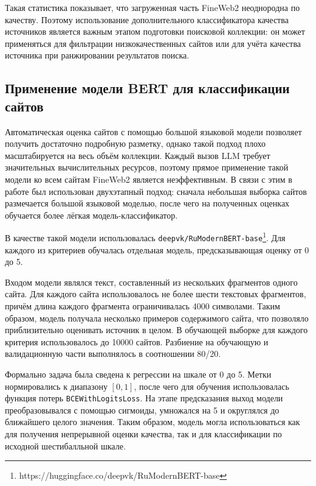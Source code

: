 \documentclass[oneside,senior,etd]{BYUPhys}
\begin{document}
Такая статистика показывает, что загруженная часть FineWeb2 неоднородна по качеству. 
Поэтому использование дополнительного классификатора качества источников является важным этапом подготовки поисковой коллекции: 
он может применяться для фильтрации низкокачественных сайтов или для учёта качества источника при ранжировании результатов поиска.

\subsection{Применение модели BERT для классификации сайтов}

Автоматическая оценка сайтов с помощью большой языковой модели позволяет получить достаточно подробную разметку, 
однако такой подход плохо масштабируется на весь объём коллекции. Каждый вызов LLM требует значительных вычислительных ресурсов, 
поэтому прямое применение такой модели ко всем сайтам FineWeb2 является неэффективным. 
В связи с этим в работе был использован двухэтапный подход: 
сначала небольшая выборка сайтов размечается большой языковой моделью, 
после чего на полученных оценках обучается более лёгкая модель-классификатор.

В качестве такой модели использовалась \texttt{deepvk/RuModernBERT-base}\footnote{https://huggingface.co/deepvk/RuModernBERT-base}. 
Для каждого из критериев обучалась отдельная модель, предсказывающая оценку от 0 до 5. 

Входом модели являлся текст, составленный из нескольких фрагментов одного сайта. 
Для каждого сайта использовалось не более шести текстовых фрагментов, причём длина каждого фрагмента ограничивалась 4000 символами. 
Таким образом, модель получала несколько примеров содержимого сайта, что позволяло приблизительно оценивать источник в целом. 
В обучающей выборке для каждого критерия использовалось до 10000 сайтов. 
Разбиение на обучающую и валидационную части выполнялось в соотношении 80/20.

Формально задача была сведена к регрессии на шкале от 0 до 5. 
Метки нормировались к диапазону $[0, 1]$, после чего для обучения использовалась функция потерь \texttt{BCEWithLogitsLoss}. 
На этапе предсказания выход модели преобразовывался с помощью сигмоиды, умножался на 5 и округлялся до ближайшего целого значения. 
Таким образом, модель могла использоваться как для получения непрерывной оценки качества, 
так и для классификации по исходной шестибалльной шкале.
\end{document}

